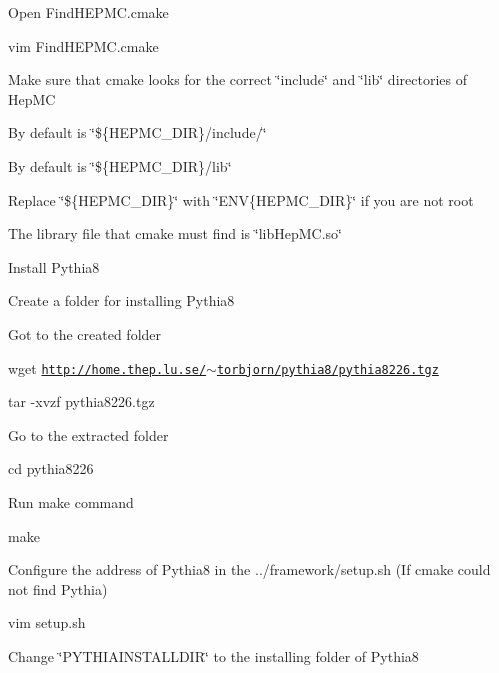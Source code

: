\begin{DoxyEnumerate}
\begin{DoxyItemize}
\item Open Find\+H\+E\+P\+M\+C.\+cmake
\begin{DoxyItemize}
\item vim Find\+H\+E\+P\+M\+C.\+cmake
\end{DoxyItemize}
\item Make sure that cmake looks for the correct \char`\"{}include\char`\"{} and \char`\"{}lib\char`\"{} directories of Hep\+MC
\begin{DoxyItemize}
\item By default is \char`\"{}\$\{\+H\+E\+P\+M\+C\+\_\+\+D\+I\+R\}/include/\char`\"{}
\item By default is \char`\"{}\$\{\+H\+E\+P\+M\+C\+\_\+\+D\+I\+R\}/lib\char`\"{}
\item Replace \char`\"{}\$\{\+H\+E\+P\+M\+C\+\_\+\+D\+I\+R\}\char`\"{} with \char`\"{}\+E\+N\+V\{\+H\+E\+P\+M\+C\+\_\+\+D\+I\+R\}\char`\"{} if you are not root
\end{DoxyItemize}
\item The library file that cmake must find is \char`\"{}lib\+Hep\+M\+C.\+so\char`\"{}
\end{DoxyItemize}
\item Install Pythia8
\begin{DoxyItemize}
\item Create a folder for installing Pythia8
\item Got to the created folder
\item wget \href{http://home.thep.lu.se/~torbjorn/pythia8/pythia8226.tgz}{\tt http\+://home.\+thep.\+lu.\+se/$\sim$torbjorn/pythia8/pythia8226.\+tgz}
\item tar -\/xvzf pythia8226.\+tgz
\item Go to the extracted folder
\begin{DoxyItemize}
\item cd pythia8226
\end{DoxyItemize}
\item Run make command
\begin{DoxyItemize}
\item make
\end{DoxyItemize}
\end{DoxyItemize}
\item Configure the address of Pythia8 in the ../framework/setup.sh (If cmake could not find Pythia)
\begin{DoxyItemize}
\item vim setup.\+sh
\item Change \char`\"{}\+P\+Y\+T\+H\+I\+A\+I\+N\+S\+T\+A\+L\+L\+D\+I\+R\char`\"{} to the installing folder of Pythia8

\end{DoxyItemize}
\end{DoxyEnumerate}
